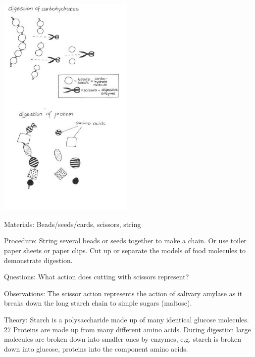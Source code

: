 \begin{multicols}{2}
\begin{center}
\includegraphics[width=0.49\textwidth]{./img/vso/digestion-models.jpg}
\end{center}

\begin{description*}
\item[Materials:]{Beads/seeds/cards, scissors, string}
\item[Procedure:]{String several beads or seeds together to make a chain. Or use toiler paper sheets or paper clips. Cut up or separate the models of food molecules to
demonstrate digestion.}
\item[Questions:]{What action does cutting with scissors represent?}
\item[Observations:]{The scissor action represents the action of salivary amylase as it breaks down the long
starch chain to simple sugars (maltose).}
\item[Theory:]{Starch is a polysaccharide made up of many identical glucose molecules. 27
Proteins are made up from many different amino acids. During
digestion large molecules are broken down into smaller ones by
enzymes, e.g. starch is broken down into glucose, proteins into the
component amino acids.}
\end{description*}


\end{multicols}
